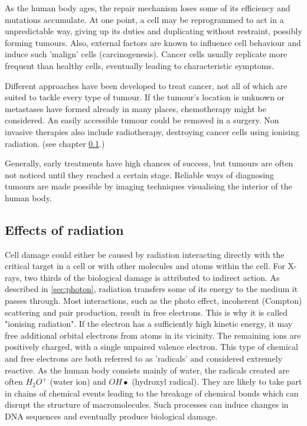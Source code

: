 As the human body ages, the repair mechanism loses some of its efficiency and mutations accumulate.
At one point, a cell may be reprogrammed to act in a unpredictable way, giving up its duties and duplicating without restraint, possibly forming tumours.
Also, external factors are known to influence cell behaviour and induce such 'malign' cells (carcinogenesis).
Cancer cells usually replicate more frequent than healthy cells, eventually leading to characteristic symptoms.

Different approaches have been developed to treat cancer, not all of which are suited to tackle every type of tumour.
If the tumour's location is unknown or metastases have formed already in many places, chemotherapy might be considered.
An easily accessible tumour could be removed in a surgery.
Non invasive therapies also include radiotherapy, destroying cancer cells using ionising radiation. (see chapter \ref{sec:irradiate}.)

Generally, early treatments have high chances of success, but tumours are often not noticed until they reached a certain stage. 
Reliable ways of diagnosing tumours are made possible by imaging techniques visualising the interior of the human body. \cite{Baumann2017, joiner2009}

\subsection{Effects of radiation}
\label{sec:irradiate}

Cell damage could either be caused by radiation interacting directly with the critical target in a cell or with other molecules and atoms within the cell.
For X-rays, two thirds of the biological damage is attributed to indirect action.
As described in \ref{sec:photon}, radiation transfers some of its energy to the medium it passes through.
Most interactions, such as the photo effect, incoherent (Compton) scattering and pair production, result in free electrons.
This is why it is called "ionising radiation".
If the electron has a sufficiently high kinetic energy, it may free additional orbital electrons from atoms in its vicinity.
The remaining ions are positively charged, with a single unpaired valence electron.
This type of chemical and free electrons are both referred to as 'radicals' and considered extremely reactive.
As the human body consists mainly of water, the radicals created are often $H_2O^+$ (water ion) and $OH \bullet$ (hydroxyl radical).
They are likely to take part in chains of chemical events leading to the breakage of chemical bonds which can disrupt the structure of macromolecules.
Such processes can induce changes in DNA sequences and eventually produce biological damage. \\

